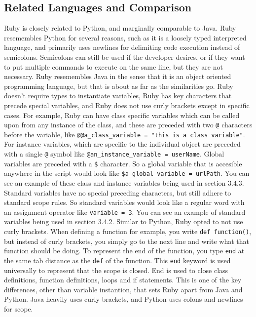 \documentclass{article}
\begin{document}
\subsection{Related Languages and Comparison}
  Ruby is closely related to Python, and marginally comparable to Java.
  Ruby resemembles Python for several reasons, such as it is a loosely typed interpreted language, and primarily uses newlines for delimiting
  code execution instead of semicolons. Semicolons can still be used if the developer desires, or if they want to put multiple commands to execute on the same line, 
  but they are not necessary. \newline
  Ruby resemembles Java in the sense that it is an object oriented programming language, but that is about as far as the similarities go. Ruby doesn't require types to instantiate variables, 
  Ruby has key characters that precede special variables, and Ruby does not use curly brackets except in specific cases. For example, Ruby can have class specific variables which can be called upon from any instance of the class, and these are
  preceded with two \verb|@| characters before the variable, like \verb|@@a_class_variable = "this is a class variable"|. For instance variables, which are specific to the individual object are preceded with a single \verb|@| symbol like \verb|@an_instance_variable = userName|.
  Global variables are preceded with a \verb|$| character. So a global variable that is accesible anywhere in the script would look like \verb|$a_global_variable = urlPath|. You can see an example of these class and instance variables being used in section 3.4.3.
  Standard variables have no special preceding characters, but still adhere to standard scope rules. So standard variables would look like a regular word with an assignment operator like \verb|variable = 3|. You can see an example of standard variables being used in section 3.4.2. \newline
  Similar to Python, Ruby opted to not use curly brackets. When defining a function for example, you write \verb|def function()|, but instead of curly brackets, you simply go to the next line and write what
  that function should be doing. To represent the end of the function, you type \verb|end| at the same tab distance as the \verb|def| of the function. This \verb|end| keyword is used universally to represent that the scope is closed.
  End is used to close class definitions, function definitions, loops and if statements. This is one of the key differences, other than variable instantion, that sets Ruby apart from Java and Python.
  Java heavily uses curly brackets, and Python uses colons and newlines for scope.
\end{document}
